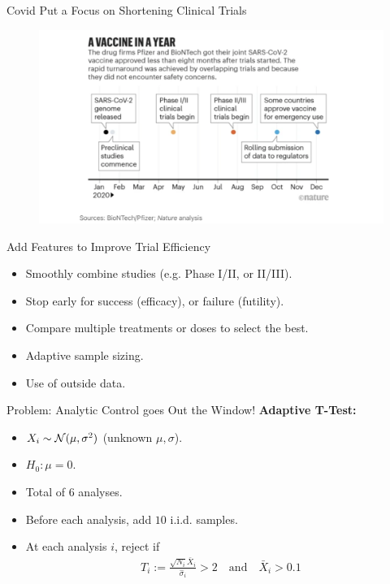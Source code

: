 \begin{frame}{Covid Put a Focus on Shortening Clinical Trials}
\begin{figure}
    \centering
    \includegraphics[width=\linewidth]{figs/covid.png}
\end{figure}    
\end{frame}

\begin{frame}{Add Features to Improve Trial Efficiency}
\begin{itemize}
    \item Smoothly combine studies (e.g. Phase I/II, or II/III).
    \item Stop early for success (efficacy), or failure (futility).
    \item Compare multiple treatments or doses to select the best.
    \item Adaptive sample sizing.
    \item Use of outside data.
\end{itemize} 
\end{frame}

\begin{frame}{Problem: Analytic Control goes Out the Window!}
\textbf{Adaptive T-Test:}
\begin{itemize}
    \item $X_i \sim \mathcal{N}(\mu, \sigma^2)$ (unknown $\mu, \sigma$).
    \item $H_0: \mu = 0$.
    \item Total of $6$ analyses.
    \item Before each analysis, add $10$ i.i.d. samples.
    \item At each analysis $i$, reject if 
    \begin{align*}
        T_i := \frac{\sqrt{N_i} \bar{X}_i}{\hat{\sigma}_i} > 2
        \quad \text{and} \quad
        \bar{X}_i > 0.1
    \end{align*}
\end{itemize}
\end{frame}


